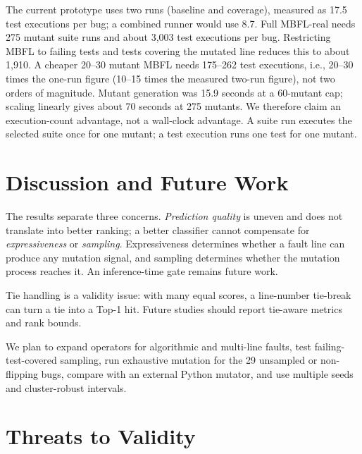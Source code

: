 \documentclass[10pt,conference]{IEEEtran}
\begin{document}
The current prototype uses two runs (baseline and coverage), measured as 17.5 test executions per bug; a combined runner would use 8.7. Full MBFL-real needs 275 mutant suite runs and about 3,003 test executions per bug. Restricting MBFL to failing tests and tests covering the mutated line reduces this to about 1,910. A cheaper 20--30 mutant MBFL needs 175--262 test executions, i.e., 20--30 times the one-run figure (10--15 times the measured two-run figure), not two orders of magnitude. Mutant generation was 15.9 seconds at a 60-mutant cap; scaling linearly gives about 70 seconds at 275 mutants. We therefore claim an execution-count advantage, not a wall-clock advantage. A suite run executes the selected suite once for one mutant; a test execution runs one test for one mutant.

\section{Discussion and Future Work}

The results separate three concerns. \emph{Prediction quality} is uneven and does not translate into better ranking; a better classifier cannot compensate for \emph{expressiveness} or \emph{sampling}. Expressiveness determines whether a fault line can produce any mutation signal, and sampling determines whether the mutation process reaches it. An inference-time gate remains future work.

Tie handling is a validity issue: with many equal scores, a line-number tie-break can turn a tie into a Top-1 hit. Future studies should report tie-aware metrics and rank bounds.

We plan to expand operators for algorithmic and multi-line faults, test failing-test-covered sampling, run exhaustive mutation for the 29 unsampled or non-flipping bugs, compare with an external Python mutator, and use multiple seeds and cluster-robust intervals.

\section{Threats to Validity}
\end{document}
